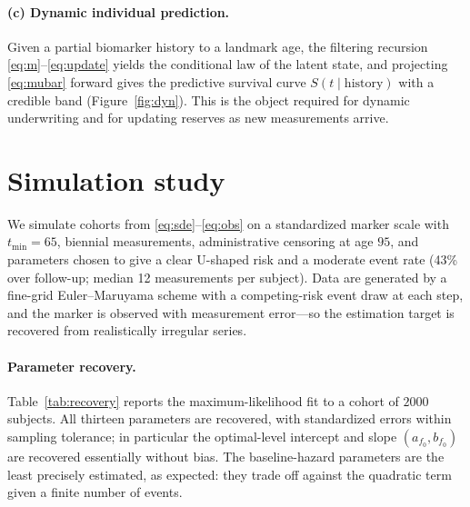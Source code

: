 \documentclass[review,3p,times]{elsarticle}
\begin{document}
\paragraph{(c) Dynamic individual prediction.} Given a partial biomarker history to
a landmark age, the filtering recursion \eqref{eq:m}--\eqref{eq:update} yields the
conditional law of the latent state, and projecting \eqref{eq:mubar} forward gives
the predictive survival curve $S(t\mid\text{history})$ with a credible band
(Figure~\ref{fig:dyn}). This is the object required for dynamic underwriting and
for updating reserves as new measurements arrive.

\section{Simulation study}\label{sec:sim}

We simulate cohorts from \eqref{eq:sde}--\eqref{eq:obs} on a standardized marker
scale with $t_{\min}=65$, biennial measurements, administrative censoring at age
$95$, and parameters chosen to give a clear U-shaped risk and a moderate event rate
(43\% over follow-up; median 12 measurements per subject). Data are generated by a
fine-grid Euler--Maruyama scheme with a competing-risk event draw at each step, and
the marker is observed with measurement error---so the estimation target is
recovered from realistically irregular series.

\paragraph{Parameter recovery.} Table~\ref{tab:recovery} reports the
maximum-likelihood fit to a cohort of $2000$ subjects. All thirteen parameters are
recovered, with standardized errors within sampling tolerance; in particular the
optimal-level intercept and slope $(a_{f_0},b_{f_0})$ are recovered essentially
without bias. The baseline-hazard parameters are the least precisely estimated, as
expected: they trade off against the quadratic term given a finite number of
events.
\end{document}
